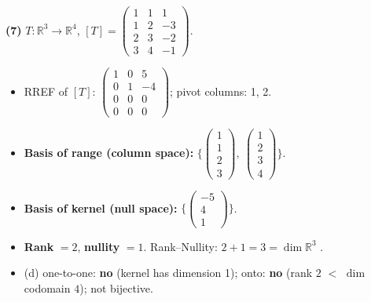 \noindent\textbf{(7)} $T:\mathbb{R}^3\to\mathbb{R}^4$, $[T]=\begin{pmatrix}1 & 1 & 1 \\ 1 & 2 & -3 \\ 2 & 3 & -2 \\ 3 & 4 & -1\end{pmatrix}$.
\begin{itemize}
\item RREF of $[T]$: $\begin{pmatrix}1 & 0 & 5 \\ 0 & 1 & -4 \\ 0 & 0 & 0 \\ 0 & 0 & 0\end{pmatrix}$; pivot columns: 1, 2.
\item \textbf{Basis of range (column space):} $\Big\{\begin{pmatrix}1 \\ 1 \\ 2 \\ 3\end{pmatrix},\ \begin{pmatrix}1 \\ 2 \\ 3 \\ 4\end{pmatrix}\Big\}$.
\item \textbf{Basis of kernel (null space):} $\Big\{\begin{pmatrix}-5 \\ 4 \\ 1\end{pmatrix}\Big\}$.
\item \textbf{Rank} $=2$, \textbf{nullity} $=1$. Rank--Nullity: $2+1=3=\dim\mathbb{R}^3$ \checkmark.
\item (d) one-to-one: \textbf{no} (kernel has dimension 1); onto: \textbf{no} (rank $2$ $<$ $\dim$ codomain $4$); not bijective.
\end{itemize}

